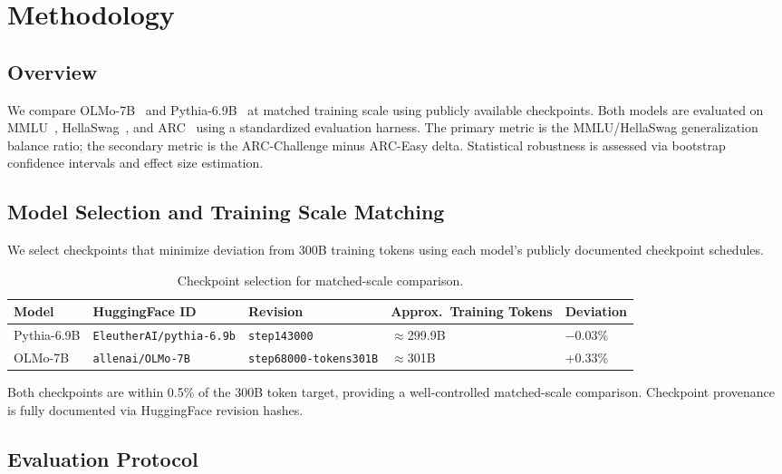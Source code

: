 \section{Methodology}

\subsection{Overview}

We compare OLMo-7B~\cite{Groeneveld2024OLMo} and Pythia-6.9B~\cite{Biderman2023Pythia} at matched training scale using publicly available checkpoints. Both models are evaluated on MMLU~\cite{Hendrycks2021MMLU}, HellaSwag~\cite{Zellers2019HellaSwag}, and ARC~\cite{Clark2018ARC} using a standardized evaluation harness. The primary metric is the MMLU/HellaSwag generalization balance ratio; the secondary metric is the ARC-Challenge minus ARC-Easy delta. Statistical robustness is assessed via bootstrap confidence intervals and effect size estimation.

\subsection{Model Selection and Training Scale Matching}

We select checkpoints that minimize deviation from 300B training tokens using each model's publicly documented checkpoint schedules.

\begin{table}[h]
\centering
\caption{Checkpoint selection for matched-scale comparison.}
\begin{tabular}{lllll}
\toprule
Model & HuggingFace ID & Revision & Approx.\ Training Tokens & Deviation \\
\midrule
Pythia-6.9B & \texttt{EleutherAI/pythia-6.9b} & \texttt{step143000} & $\approx$299.9B & $-$0.03\% \\
OLMo-7B & \texttt{allenai/OLMo-7B} & \texttt{step68000-tokens301B} & $\approx$301B & $+$0.33\% \\
\bottomrule
\end{tabular}
\end{table}

Both checkpoints are within 0.5\% of the 300B token target, providing a well-controlled matched-scale comparison. Checkpoint provenance is fully documented via HuggingFace revision hashes.

\subsection{Evaluation Protocol}

